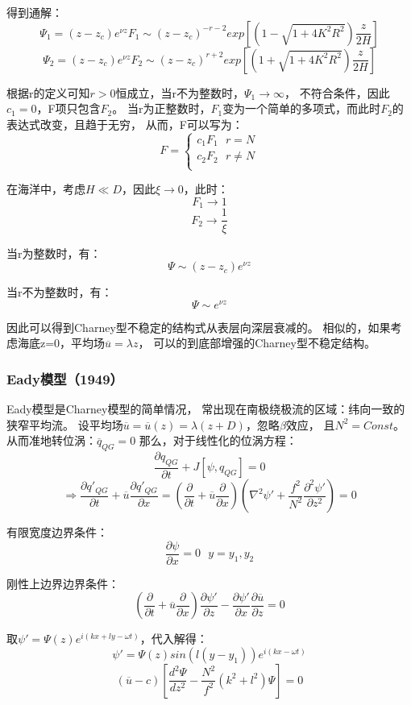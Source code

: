 \documentclass{article}
\begin{document}
得到通解：
$$\Psi_1  = (z-z_c)e^{\nu z}F_1 \sim
(z-z_c)^{-r-2}exp\left[\left(1-\sqrt{1+4K^2R^2}\right)\frac{z}{2H}\right]$$
$$\Psi_2  = (z-z_c)e^{\nu z}F_2 \sim
(z-z_c)^{r+2}exp\left[\left(1+\sqrt{1+4K^2R^2}\right)\frac{z}{2H}\right]$$

根据r的定义可知$r>0$恒成立，当r不为整数时，$\Psi_1\rightarrow\infty$，
不符合条件，因此$c_1=0$，F项只包含$F_2$。
当r为正整数时，$F_1$变为一个简单的多项式，而此时$F_2$的表达式改变，且趋于无穷，
从而，F可以写为：
$$F=\begin{cases}
c_1F_1  \ \ \ r=N\\
c_2F_2 \ \ \ r\ne N\\
\end{cases}$$

在海洋中，考虑$H\ll D$，因此$\xi\rightarrow0$，此时：
$$F_1\rightarrow1$$
$$F_2\rightarrow\frac{1}{\xi}$$

当r为整数时，有：
$$\Psi \sim (z-z_c)e^{\nu z}$$

当r不为整数时，有：
$$\Psi \sim e^{\nu z}$$

因此可以得到Charney型不稳定的结构式从表层向深层衰减的。
相似的，如果考虑海底z=0，平均场$\overline{u} = \lambda z$，
可以的到底部增强的Charney型不稳定结构。

\subsubsection{Eady模型（1949）}
Eady模型是Charney模型的简单情况，
常出现在南极绕极流的区域：纬向一致的狭窄平均流。
设平均场$\overline{u} = \overline{u}(z) = \lambda (z+D)$，忽略$\beta$效应，
且$N^2=Const$。
从而准地转位涡：$\overline{q}_{QG} = 0$
那么，对于线性化的位涡方程：
$$\frac{\partial q_{QG}}{\partial t}+J[\psi,q_{QG}] = 0$$
$$\Rightarrow \frac{\partial q'_{QG}}{\partial t}
+\overline{u}\frac{\partial q'_{QG}}{\partial x} = 
(\frac{\partial}{\partial t}
+\overline{u}\frac{\partial }{\partial x})(\nabla^2\psi' + 
\frac{f^2}{N^2}\frac{\partial^2 \psi'}{\partial z^2})=0$$

有限宽度边界条件：
$$\frac{\partial \psi}{\partial x} = 0 \ \ \ y = y_1, y_2$$

刚性上边界边界条件：
$$(\frac{\partial }{\partial t}
+\overline{u}\frac{\partial}{\partial x})
\frac{\partial \psi'}{\partial z}
- \frac{\partial \psi'}{\partial x}\frac{\partial \overline{u}}{\partial z}
=0$$

取$\psi' = \Psi(z)e^{i(kx+ly-\omega t)}$，代入解得：
$$\psi' = \Psi(z)sin(l(y-y_1))e^{i(kx-\omega t)}$$
$$(\overline{u} - c)
[\frac{d^2\Psi}{dz^2} - \frac{N^2}{f^2}(k^2+l^2)\Psi] =0$$
\end{document}

